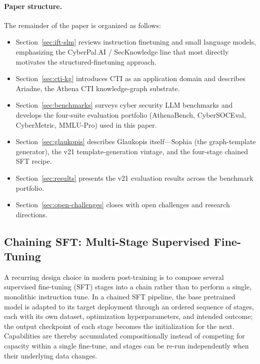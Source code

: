\documentclass[unnumsec,webpdf,contemporary,large]{oup-authoring-template}
\theoremstyle{thmstyleone}
\theoremstyle{thmstyletwo}
\theoremstyle{thmstylethree}
\begin{document}
\paragraph{Paper structure.}
The remainder of the paper is organized as follows:
\begin{itemize}
  \item Section~\ref{sec:ift-slm} reviews instruction finetuning and small language models, emphasizing the CyberPal.AI / SecKnowledge line that most directly motivates the structured-finetuning approach.
  \item Section~\ref{sec:cti-kg} introduces CTI as an application domain and describes Ariadne, the Athena CTI knowledge-graph substrate.
  \item Section~\ref{sec:benchmarks} surveys cyber security LLM benchmarks and develops the four-suite evaluation portfolio (AthenaBench, CyberSOCEval, CyberMetric, MMLU-Pro) used in this paper.
  \item Section~\ref{sec:glaukopis} describes Glaukopis itself---Sophia (the graph-template generator), the v21 template-generation vintage, and the four-stage chained SFT recipe.
  \item Section~\ref{sec:results} presents the v21 evaluation results across the benchmark portfolio.
  \item Section~\ref{sec:open-challenges} closes with open challenges and research directions.
\end{itemize}

\subsection{Chaining SFT: Multi-Stage Supervised Fine-Tuning}
\label{sec:intro-chained-sft}

A recurring design choice in modern post-training is to compose several supervised fine-tuning (SFT) stages into a chain rather than to perform a single, monolithic instruction tune. In a chained SFT pipeline, the base pretrained model is adapted to its target deployment through an ordered sequence of stages, each with its own dataset, optimization hyperparameters, and intended outcome; the output checkpoint of each stage becomes the initialization for the next. Capabilities are thereby accumulated compositionally instead of competing for capacity within a single fine-tune, and stages can be re-run independently when their underlying data changes.
\end{document}
